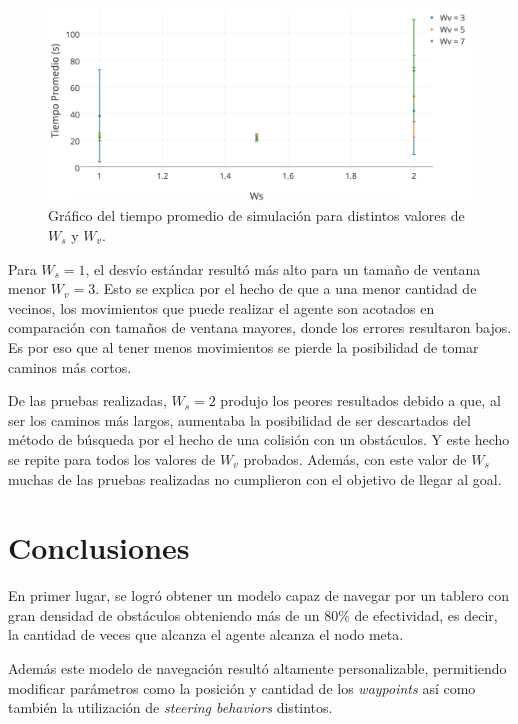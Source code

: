 \documentclass[a4paper,10pt]{article}
\begin{document}
\begin{figure}[H]
	\centering
    \includegraphics[width=\textwidth]{charts/graph.png}
    \caption{Gráfico del tiempo promedio de simulación para distintos valores de $W_{s}$ y $W_{v}$.}
    \label{fig:graph}
\end{figure}

Para $W_{s} = 1$, el desvío estándar resultó más alto para un tamaño de ventana menor $W_{v} = 3$. Esto se explica por el hecho de que a una menor cantidad de vecinos, los movimientos que puede realizar el agente son acotados en comparación con tamaños de ventana mayores, donde los errores resultaron bajos. Es por eso que al tener menos movimientos se pierde la posibilidad de tomar caminos más cortos.

De las pruebas realizadas, $W_{s} = 2$ produjo los peores resultados debido a que, al ser los caminos más largos, aumentaba la posibilidad de ser descartados del método de búsqueda por el hecho de una colisión con un obstáculos. Y este hecho se repite para todos los valores de $W_{v}$ probados. Además, con este valor de $W_{s}$ muchas de las pruebas realizadas no cumplieron con el objetivo de llegar al goal.

\section{Conclusiones}

En primer lugar, se logró obtener un modelo capaz de navegar por un tablero con gran densidad de obstáculos obteniendo más de  un 80\% de efectividad, es decir, la cantidad de veces que alcanza el agente alcanza el nodo meta.

Además este modelo de navegación resultó altamente personalizable, permitiendo modificar parámetros como la posición y cantidad de los \textit{waypoints} así como también la utilización de \textit{steering behaviors} distintos.
\end{document}

